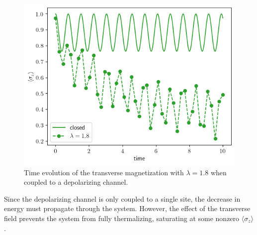 \documentclass[12pt, twocolumn]{article}
\begin{document}
  \begin{figure}
    \centering
    \includegraphics[width=\linewidth]{images/depolarization_channel_18.png}
    \caption{Time evolution of the transverse magnetization with \( \lambda = 1.8 \) when coupled to a depolarizing channel.%
      \label{fig:depolarization-channel-18}}
  \end{figure}

  Since the depolarizing channel is only coupled to a single site, the decrease in energy must propagate through the system. However, the effect of the transverse field prevents the system from fully thermalizing, saturating at some nonzero \( \langle \sigma_{z} \rangle \).
\end{document}
